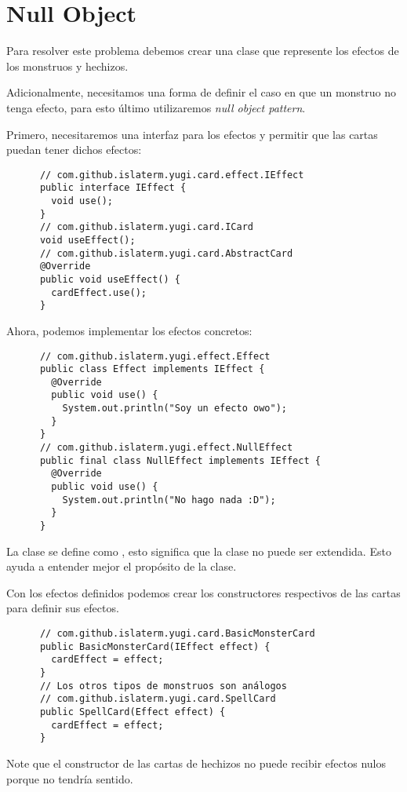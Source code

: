 \section{Null Object}
  \begin{Answer}[ref={ex:null-1}]
    Para resolver este problema debemos crear una clase que represente los efectos de los
    monstruos y hechizos.
    
    Adicionalmente, necesitamos una forma de definir el caso en que un monstruo no tenga 
    efecto, para esto último utilizaremos \textit{null object pattern}.
    
    Primero, necesitaremos una interfaz para los efectos y permitir que las cartas puedan
    tener dichos efectos:
    \begin{verbatim}
      // com.github.islaterm.yugi.card.effect.IEffect
      public interface IEffect {
        void use();
      }
      // com.github.islaterm.yugi.card.ICard
      void useEffect();
      // com.github.islaterm.yugi.card.AbstractCard
      @Override
      public void useEffect() {
        cardEffect.use();
      }      
    \end{verbatim}

    Ahora, podemos implementar los efectos concretos:
    \begin{verbatim}
      // com.github.islaterm.yugi.effect.Effect
      public class Effect implements IEffect {
        @Override
        public void use() {
          System.out.println("Soy un efecto owo");
        }
      }
      // com.github.islaterm.yugi.effect.NullEffect  
      public final class NullEffect implements IEffect {
        @Override
        public void use() {
          System.out.println("No hago nada :D");
        }
      }
    \end{verbatim}
    La clase  se define como , esto significa que la clase no
    puede ser extendida.
    Esto ayuda a entender mejor el propósito de la clase.
    
    Con los efectos definidos podemos crear los constructores respectivos de las cartas 
    para definir sus efectos.
    \begin{verbatim}
      // com.github.islaterm.yugi.card.BasicMonsterCard
      public BasicMonsterCard(IEffect effect) {
        cardEffect = effect;
      }
      // Los otros tipos de monstruos son análogos
      // com.github.islaterm.yugi.card.SpellCard
      public SpellCard(Effect effect) {
        cardEffect = effect;
      }
    \end{verbatim}

    Note que el constructor de las cartas de hechizos no puede recibir efectos nulos 
    porque no tendría sentido.
  \end{Answer}
%